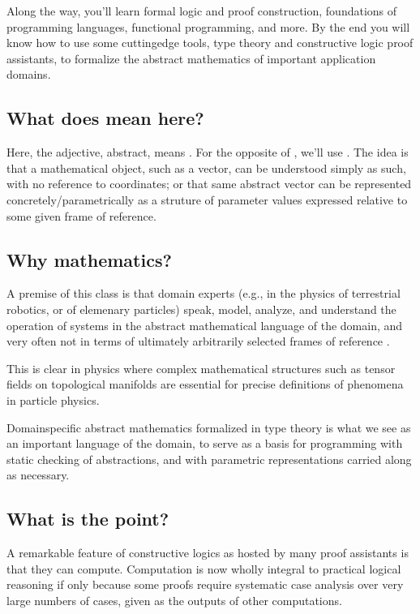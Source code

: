 \documentclass[letterpaper,10pt,english]{sphinxmanual}
\begin{document}
\sphinxAtStartPar
Along the way, you’ll learn formal logic and proof construction,
foundations of programming languages, functional programming, and
more. By the end you will know how to use some cutting\sphinxhyphen{}edge tools,
type theory and constructive logic proof assistants, to formalize
the abstract mathematics of important application domains.


\subsection{What does  mean here?}
\label{\detokenize{A_00_Introduction:what-does-abstract-mean-here}}
\sphinxAtStartPar
Here, the adjective, abstract, means .
For the opposite of , we’ll use . The idea
is that a mathematical object, such as a vector, can be understood
simply as such, with no reference to coordinates; or that same abstract
vector can be represented concretely/parametrically as a struture of
parameter values expressed relative to some given frame of reference.


\subsection{Why  mathematics?}
\label{\detokenize{A_00_Introduction:why-abstract-mathematics}}
\sphinxAtStartPar
A premise of this class is that domain experts (e.g., in the
physics of terrestrial robotics, or of elemenary particles) speak,
model, analyze, and understand the operation of systems in the
abstract mathematical language of the domain, and very often not
in terms of ultimately arbitrarily selected frames of reference .

\sphinxAtStartPar
This is clear in physics where complex mathematical structures
such as tensor fields on topological manifolds are essential for
precise definitions of phenomena in particle physics.

\sphinxAtStartPar
Domain\sphinxhyphen{}specific abstract mathematics formalized in type theory
is what we see as an important language of the domain, to serve
as a basis for programming with static checking of abstractions,
and with parametric representations carried along as necessary.


\subsection{What is the point?}
\label{\detokenize{A_00_Introduction:what-is-the-point}}
\sphinxAtStartPar
A remarkable feature of constructive logics as hosted by many
proof assistants is that they can compute. Computation is now
wholly integral to practical logical reasoning if only because
some proofs require systematic case analysis over very large
numbers of cases, given as the outputs of other computations.
\end{document}
